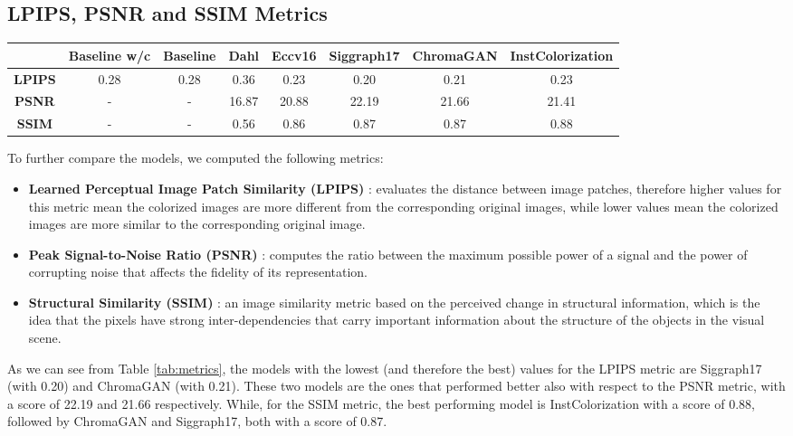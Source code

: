 \subsection{LPIPS, PSNR and SSIM Metrics}

\begin{table*}[ht]
	\begin{center}
		\begin{tabular}{c|ccccccc}
			& \textbf{Baseline w/c}&\textbf{Baseline} & \textbf{Dahl} & \textbf{Eccv16} & \textbf{Siggraph17} & \textbf{ChromaGAN} & \textbf{InstColorization}  \\
			\midrule
			\textbf{LPIPS} & 0.28 & 0.28 & 0.36 & 0.23 & 0.20 & 0.21 & 0.23 \\
			\midrule
			\textbf{PSNR} & - & - & 16.87 & 20.88 & 22.19 & 21.66 & 21.41 \\
			\midrule
			\textbf{SSIM} & - & - & 0.56 & 0.86 & 0.87 & 0.87 & 0.88 \\
		\end{tabular}
	\end{center}
	\caption{{\small  Summary of the metrics computed on different models.}}
	\label{tab:metrics}
\end{table*}

To further compare the models, we computed the following metrics:
\begin{itemize}
	\item \textbf {Learned Perceptual Image Patch Similarity (LPIPS)} \cite{lpips}: evaluates the distance between image patches, therefore higher values for this metric mean the colorized images are more different from the corresponding original images, while lower values mean the colorized images are more similar to the corresponding original image.
	\item \textbf {Peak Signal-to-Noise Ratio (PSNR)} \cite{psnr-ssim}: computes the ratio between the maximum possible power of a signal and the power of corrupting noise that affects the fidelity of its representation.
	\item \textbf {Structural Similarity (SSIM)} \cite{psnr-ssim}: an image similarity metric based on the perceived change in structural information, which is the idea that the pixels have strong inter-dependencies that carry important information about the structure of the objects in the visual scene.
\end{itemize}

As we can see from Table \ref{tab:metrics}, the models with the lowest (and therefore the best) values for the
LPIPS metric are Siggraph17 (with 0.20) and ChromaGAN (with 0.21). These two models are the ones that performed better
also with respect to the PSNR metric, with a score of 22.19 and 21.66 respectively. While, for the SSIM metric, the
best performing model is InstColorization with a score of 0.88, followed by ChromaGAN and Siggraph17, both with a
score of 0.87.

